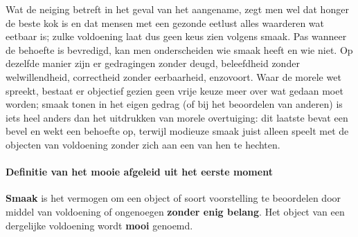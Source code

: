 Wat de neiging betreft in het geval van het aangename, zegt men wel dat honger de beste kok is en dat mensen met een gezonde eetlust alles waarderen wat eetbaar is; zulke voldoening laat dus geen keus zien volgens smaak. 
Pas wanneer de behoefte is bevredigd, kan men onderscheiden wie smaak heeft en wie niet. 
Op dezelfde manier zijn er gedragingen zonder deugd, beleefdheid zonder welwillendheid, correctheid zonder eerbaarheid, enzovoort. 
Waar de morele wet spreekt, bestaat er objectief gezien geen vrije keuze meer over wat gedaan moet worden; smaak tonen in het eigen gedrag (of bij het beoordelen van anderen) is iets heel anders dan het uitdrukken van morele overtuiging: dit laatste bevat een bevel en wekt een behoefte op, terwijl modieuze smaak juist alleen speelt met de objecten van voldoening zonder zich aan een van hen te hechten.

\paragraph{Definitie van het mooie afgeleid uit het eerste moment}
\textbf{Smaak} is het vermogen om een object of soort voorstelling te beoordelen door middel van voldoening of ongenoegen \textbf{zonder enig belang}. 
Het object van een dergelijke voldoening wordt \textbf{mooi} genoemd.

